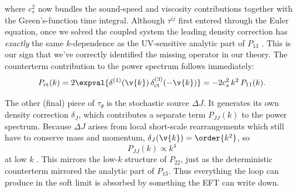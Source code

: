 where $c_s^2$ now bundles the sound-speed and viscosity contributions 
together with the Green's-function time integral. Although $\tau^{ij}$ first entered through the Euler equation, once we 
solved the coupled system the leading density correction has \textit{exactly} 
the same $k$-dependence as the UV-sensitive analytic part of $P_{13}$ 
\citep{CarrascoEtAl2012,Senatore_EFTofLSS_lectures}. This is our sign that we've correctly identified the missing operator in our theory. The counterterm contribution to the power spectrum follows immediately:
\begin{equation}
    P_{\rm ct}(k)
    =
    2\expval{
        \delta^{(1)}(\v{k})\,
        \delta_{\rm ct}^{(3)}(-\v{k})
    }
    =
    -2c_s^2\,k^2\,P_{11}(k).
\end{equation}

The other (final) piece of $\tau_\theta$ is the stochastic source $\Delta J$. It 
generates its own density correction $\delta_J$, which contributes a 
separate term $P_{JJ}(k)$ to the power spectrum. Because $\Delta J$ arises from local short-scale rearrangements which still have to conserve mass and momentum, $\delta_J(\v{k})=\order{k^2}$, so
\begin{equation}
    P_{JJ}(k)\propto k^4
\end{equation}
at low $k$ \citep{PajerZaldarriaga2013,Baldauf2020}. This mirrors the 
low-$k$ structure of $P_{22}$, just as the deterministic counterterm 
mirrored the analytic part of $P_{13}$. Thus everything the loop can produce in the soft limit is absorbed by something the EFT can write down.

